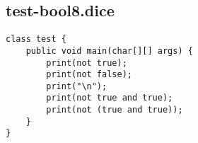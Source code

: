 \subsection{test-bool8.dice}
\begin{verbatim}
class test {
	public void main(char[][] args) {
		print(not true);
		print(not false);
		print("\n");
		print(not true and true);
		print(not (true and true));
	}
}
\end{verbatim}